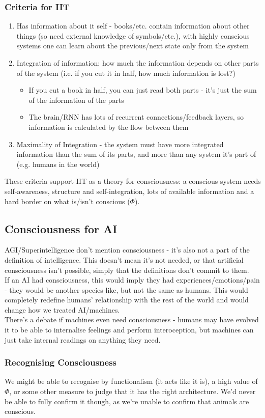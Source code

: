 \subsubsection{Criteria for IIT}
\begin{enumerate}
    \item Has information about it self - books/etc. contain information about other things (so need external knowledge of symbols/etc.), with highly conscious systems one can learn about the previous/next state only from the system
    \item Integration of information: how much the information depends on other parts of the system (i.e. if you cut it in half, how much information is lost?)
    \begin{itemize}
        \item If you cut a book in half, you can just read both parts - it's just the sum of the information of the parts
        \item The brain/RNN has lots of recurrent connections/feedback layers, so information is calculated by the flow between them
    \end{itemize}
    \item Maximality of Integration - the system must have more integrated information than the sum of its parts, and more than any system it's part of (e.g. humans in the world) 
\end{enumerate}
These criteria support IIT as a theory for consciousness: a conscious system needs self-awareness, structure and self-integration, lots of available information and a hard border on what is/isn't conscious ($\Phi$).

\subsection{Consciousness for AI}
AGI/Superintelligence don't mention consciousness - it's also not a part of the definition of intelligence. This doesn't mean it's not needed, or that artificial consciousness isn't possible, simply that the definitions don't commit to them.\\

If an AI had consciousness, this would imply they had experiences/emotions/pain - they would be another species like, but not the same as humans. This would completely redefine humans' relationship with the rest of the world and would change how we treated AI/machines.\\

There's a debate if machines even need consciousness - humans may have evolved it to be able to internalise feelings and perform interoception, but machines can just take internal readings on anything they need.

\subsubsection{Recognising Consciousness}
We might be able to recognise by functionalism (it acts like it is), a high value of $\Phi$, or some other measure to judge that it has the right architecture. We'd never be able to fully confirm it though, as we're unable to confirm that animals are conscious. 